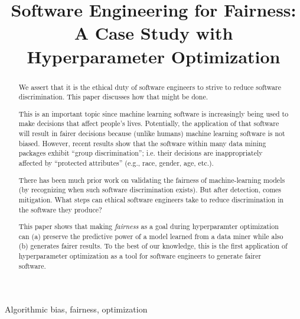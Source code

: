 \documentclass[10pt,conference,review]{IEEEtran}
\begin{document}
\title{Software Engineering for Fairness: \\A Case Study with Hyperparameter Optimization}

\author{}

\author{
}




\maketitle
\thispagestyle{plain}
\pagestyle{plain}

\begin{abstract}
We assert that it is the ethical duty of software engineers to strive to reduce software discrimination.  This paper discusses how that might be done.

This is an important topic since
machine learning software is increasingly being used to make decisions that affect people's lives.  Potentially,  the application of that software will result in fairer decisions because (unlike humans) machine learning software is not biased. However, recent results show that the software within many data mining packages exhibit ``group discrimination''; i.e. their decisions are  inappropriately affected by   “protected attributes” (e.g., race, gender, age, etc.).

There has been much prior work  on validating the fairness of machine-learning models (by recognizing when such software discrimination exists). But after detection, comes mitigation. What steps can ethical software engineers take to reduce discrimination in the software they produce?  

This paper shows that making \textit{fairness} as a goal during hyperparamter optimization can (a) preserve the predictive power of a model learned from a data miner while also (b) generates fairer results. To the best of  our knowledge, this is the first application  of hyperparameter optimization as a tool for software engineers to generate fairer software.

\end{abstract}

\begin{IEEEkeywords}
Algorithmic bias, fairness,  optimization
\end{IEEEkeywords}
\end{document}
